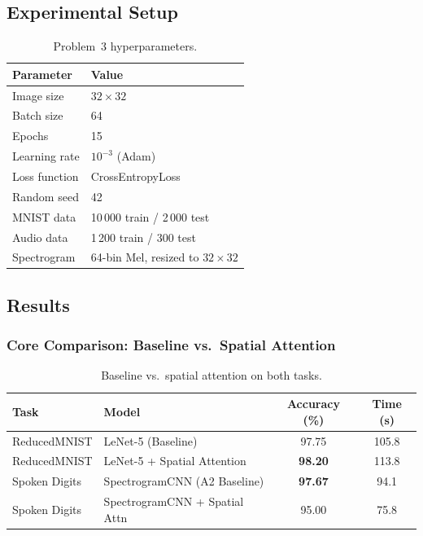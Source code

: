 \documentclass[12pt, a4paper]{article}
\renewcommand{\arraystretch}{1.12}
\begin{document}
\subsection{Experimental Setup}

\begin{table}[H]
\centering
\renewcommand{\arraystretch}{1.3}
\begin{tabular}{l l}
\toprule
\textbf{Parameter} & \textbf{Value} \\
\midrule
Image size         & $32 \times 32$ \\
Batch size         & 64 \\
Epochs             & 15 \\
Learning rate      & $10^{-3}$ (Adam) \\
Loss function      & CrossEntropyLoss \\
Random seed        & 42 \\
\midrule
MNIST data         & 10\,000 train / 2\,000 test \\
Audio data         & 1\,200 train / 300 test \\
Spectrogram        & 64-bin Mel, resized to $32 \times 32$ \\
\bottomrule
\end{tabular}
\caption{Problem~3 hyperparameters.}
\label{tab:p3_hyperparams}
\end{table}

\subsection{Results}

\subsubsection{Core Comparison: Baseline vs.\ Spatial Attention}

\begin{table}[H]
\centering
\renewcommand{\arraystretch}{1.3}
\begin{tabular}{l l c c}
\toprule
\textbf{Task} & \textbf{Model} & \textbf{Accuracy (\%)} & \textbf{Time (s)} \\
\midrule
ReducedMNIST       & LeNet-5 (Baseline)            & 97.75 & 105.8 \\
ReducedMNIST       & LeNet-5 + Spatial Attention    & \textbf{98.20} & 113.8 \\
\midrule
Spoken Digits      & SpectrogramCNN (A2 Baseline)   & \textbf{97.67} & 94.1 \\
Spoken Digits      & SpectrogramCNN + Spatial Attn  & 95.00 & 75.8 \\
\bottomrule
\end{tabular}
\caption{Baseline vs.\ spatial attention on both tasks.}
\label{tab:p3_core}
\end{table}
\end{document}
